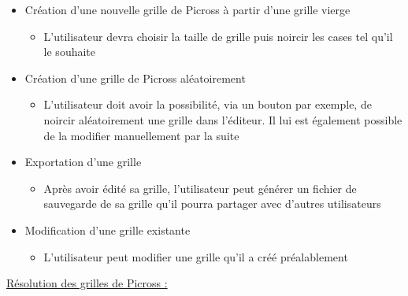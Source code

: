 \documentclass[a4paper, 12pt, twoside]{article}
\begin{document}
\begin{itemize}\setlength{\itemsep}{5mm}

 \item[\textbullet] Création d'une nouvelle grille de Picross à partir d'une grille vierge\newline
 \begin{itemize}
  \item L'utilisateur devra choisir la taille de grille puis noircir les cases tel qu'il le souhaite
 \end{itemize}

 \item[\textbullet] Création d'une grille de Picross aléatoirement\newline
 \begin{itemize}
  \item L'utilisateur doit avoir la possibilité, via un bouton par exemple, de noircir aléatoirement une grille dans l'éditeur. Il lui est également possible de la modifier manuellement par la suite
 \end{itemize}

 \item[\textbullet] Exportation d'une grille\newline
 \begin{itemize}
  \item Après avoir édité sa grille, l'utilisateur peut générer un fichier de sauvegarde de sa grille qu'il pourra partager avec d'autres utilisateurs
 \end{itemize}

 \item[\textbullet] Modification d'une grille existante\newline
 \begin{itemize}
  \item L'utilisateur peut modifier une grille qu'il a créé préalablement
 \end{itemize}

\end{itemize}

\ul{R\'esolution des grilles de Picross :}\newline
\end{document}
